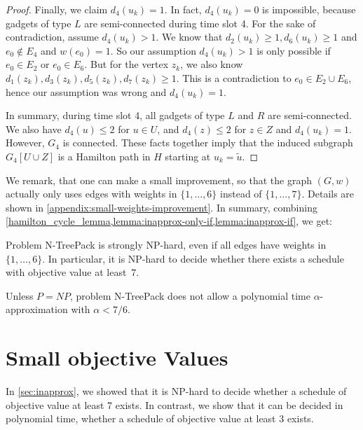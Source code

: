 \documentclass[runningheads]{llncs}
\newcommand{\set}[1]{\{ #1 \}}
\newcommand{\fromto}[2]{\set{#1, \ldots, #2}}
\newcommand{\xxxNTP}{{\sc N-TreePack}}
\begin{document}
\begin{proof}
Finally, we claim $d_4(u_k) = 1$. In fact, $d_4(u_k) = 0$ is impossible, because gadgets of type $L$ are semi-connected during time slot 4. For the sake of contradiction, assume $d_4(u_k) > 1$. We know that $d_2(u_k) \geq 1, d_6(u_k) \geq 1$ and $e_0 \not\in E_4$ and $w(e_0) = 1$. So our assumption $d_4(u_k) > 1$ is only possible if $e_0 \in E_2$ or $e_0 \in E_6$. But for the vertex $z_k$, we also know $d_1(z_k), d_3(z_k), d_5(z_k), d_7(z_k) \geq 1$. This is a contradiction to $e_0 \in E_2 \cup E_6$, hence our assumption was wrong and $d_4(u_k) = 1$.

In summary, during time slot 4, all gadgets of type $L$ and $R$ are semi-connected. We also have $d_4(u) \leq 2$ for $u \in U$, and $d_4(z) \leq 2$ for $z \in Z$ and $d_4(u_k) = 1$. However, $G_4$ is connected. These facts together imply that the induced subgraph $G_4[U \cup Z]$ is a Hamilton path in $H$ starting at $u_k = \tilde{u}$.
\end{proof}

We remark, that one can make a small improvement, so that the graph $(G, w)$ actually only uses edges with weights in $\fromto{1}{6}$ instead of $\fromto{1}{7}$. Details are shown in \cref{appendix:small-weights-improvement}. In summary, combining \cref{hamilton_cycle_lemma,lemma:inapprox-only-if,lemma:inapprox-if}, we get:

\begin{theorem}
\label{th:small-weights}
Problem {\xxxNTP} is strongly NP-hard, even if all edges have weights in $\fromto{1}{6}$.
In particular, it is NP-hard to decide whether there exists a schedule with objective value at least~$7$.
\end{theorem}

\begin{corollary}
\label{coro:inapproximability}
Unless $P=NP$, problem {\xxxNTP} does not allow a polynomial time $\alpha$-approximation 
with $\alpha<7/6$.
\end{corollary}

\section{Small objective Values}
\label{sec:small-objective}
In \cref{sec:inapprox}, we showed that it is NP-hard to decide whether a schedule of objective value at least 7 exists. In contrast, we show that it can be decided in polynomial time, whether a schedule of objective value at least 3 exists.
\end{document}
